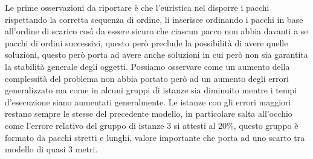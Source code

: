 Le prime osservazioni da riportare è che l'euristica nel disporre i pacchi rispettando la corretta sequenza di ordine, li inserisce ordinando i pacchi in base all'ordine di scarico così da essere sicuro che ciascun pacco non abbia davanti a se pacchi di ordini successivi, questo però preclude la possibilità di avere quelle soluzioni, questo però porta ad avere anche soluzioni in cui però non sia garantita la stabilità generale degli oggetti. Possiamo osservare come un aumento della complessità del problema non abbia portato però ad un aumento degli errori generalizzato ma come in alcuni gruppi di istanze sia diminuito mentre i tempi d'esecuzione siano aumentati generalmente. Le istanze con gli errori maggiori restano sempre le stesse del precedente modello, in particolare salta all'occhio come l'errore relativo del gruppo di istanze 3 si attesti al 20\%, questo gruppo è formato da pacchi stretti e lunghi, valore importante che porta ad uno scarto tra modello di quasi 3 metri.

\newpage
